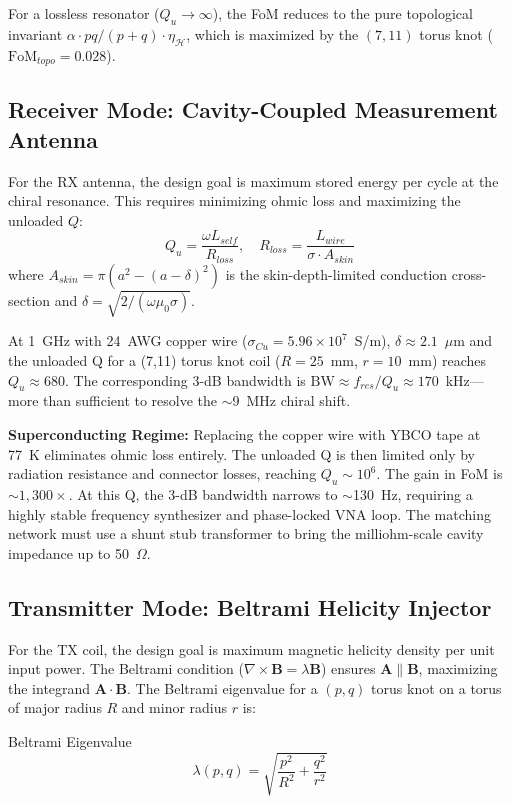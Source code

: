 For a lossless resonator ($Q_u \to \infty$), the FoM reduces to the pure topological invariant $\alpha \cdot pq/(p+q) \cdot \eta_{\mathcal{H}}$, which is maximized by the $(7,11)$ torus knot ($\text{FoM}_{topo} = 0.028$).

\subsection{Receiver Mode: Cavity-Coupled Measurement Antenna}
\label{sec:rx_antenna}

For the RX antenna, the design goal is maximum stored energy per cycle at the chiral resonance. This requires minimizing ohmic loss and maximizing the unloaded $Q$:
\begin{equation}
    Q_u = \frac{\omega L_{self}}{R_{loss}}, \quad R_{loss} = \frac{L_{wire}}{\sigma \cdot A_{skin}}
\end{equation}
where $A_{skin} = \pi(a^2 - (a - \delta)^2)$ is the skin-depth-limited conduction cross-section and $\delta = \sqrt{2/(\omega \mu_0 \sigma)}$.

At 1~GHz with 24~AWG copper wire ($\sigma_{Cu} = 5.96 \times 10^7$~S/m), $\delta \approx 2.1$~$\mu$m and the unloaded Q for a (7,11) torus knot coil ($R = 25$~mm, $r = 10$~mm) reaches $Q_u \approx 680$. The corresponding 3-dB bandwidth is $\text{BW} \approx f_{res}/Q_u \approx 170$~kHz---more than sufficient to resolve the $\sim$9~MHz chiral shift.

\textbf{Superconducting Regime:} Replacing the copper wire with YBCO tape at 77~K eliminates ohmic loss entirely. The unloaded Q is then limited only by radiation resistance and connector losses, reaching $Q_u \sim 10^6$. The gain in FoM is $\sim 1{,}300\times$. At this Q, the 3-dB bandwidth narrows to $\sim$130~Hz, requiring a highly stable frequency synthesizer and phase-locked VNA loop. The matching network must use a shunt stub transformer to bring the milliohm-scale cavity impedance up to 50~$\Omega$.

\subsection{Transmitter Mode: Beltrami Helicity Injector}
\label{sec:tx_coil}

For the TX coil, the design goal is maximum magnetic helicity density per unit input power. The Beltrami condition ($\nabla \times \mathbf{B} = \lambda \mathbf{B}$) ensures $\mathbf{A} \parallel \mathbf{B}$, maximizing the integrand $\mathbf{A} \cdot \mathbf{B}$. The Beltrami eigenvalue for a $(p,q)$ torus knot on a torus of major radius $R$ and minor radius $r$ is:
\begin{resultbox}{Beltrami Eigenvalue}
\begin{equation}
    \lambda(p,q) = \sqrt{\frac{p^2}{R^2} + \frac{q^2}{r^2}}
    \label{eq:beltrami_lambda}
\end{equation}
\end{resultbox}

